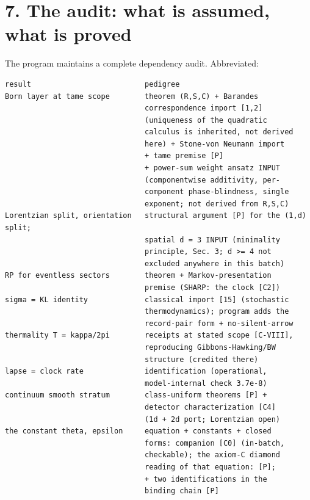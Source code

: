 \documentclass[11pt]{article}
\begin{document}
\section*{7. The audit: what is assumed, what is proved}
The program maintains a complete dependency audit.  Abbreviated:

\begin{small}\begin{verbatim}
result                          pedigree
Born layer at tame scope        theorem (R,S,C) + Barandes
                                correspondence import [1,2]
                                (uniqueness of the quadratic
                                calculus is inherited, not derived
                                here) + Stone-von Neumann import
                                + tame premise [P]
                                + power-sum weight ansatz INPUT
                                (componentwise additivity, per-
                                component phase-blindness, single
                                exponent; not derived from R,S,C)
Lorentzian split, orientation   structural argument [P] for the (1,d) split;
                                spatial d = 3 INPUT (minimality
                                principle, Sec. 3; d >= 4 not
                                excluded anywhere in this batch)
RP for eventless sectors        theorem + Markov-presentation
                                premise (SHARP: the clock [C2])
sigma = KL identity             classical import [15] (stochastic
                                thermodynamics); program adds the
                                record-pair form + no-silent-arrow
thermality T = kappa/2pi        receipts at stated scope [C-VIII],
                                reproducing Gibbons-Hawking/BW
                                structure (credited there)
lapse = clock rate              identification (operational,
                                model-internal check 3.7e-8)
continuum smooth stratum        class-uniform theorems [P] +
                                detector characterization [C4]
                                (1d + 2d port; Lorentzian open)
the constant theta, epsilon     equation + constants + closed
                                forms: companion [C0] (in-batch,
                                checkable); the axiom-C diamond
                                reading of that equation: [P];
                                + two identifications in the
                                binding chain [P]
\end{verbatim}\end{small}
\end{document}
